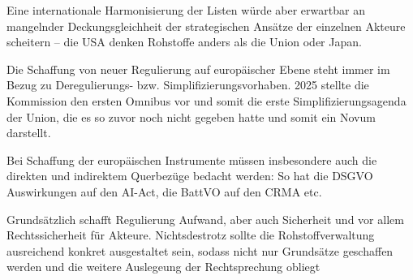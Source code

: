 \documentclass[12pt,a4paper,oneside]{book} %
\begin{document}
Eine internationale Harmonisierung der Listen würde aber erwartbar an mangelnder Deckungsgleichheit der strategischen Ansätze der einzelnen Akteure scheitern -- die USA denken Rohstoffe anders als die Union oder Japan.

Die Schaffung von neuer Regulierung auf europäischer Ebene steht immer im Bezug zu Deregulierungs- bzw. Simplifizierungsvorhaben. 2025 stellte die Kommission den ersten Omnibus vor und somit die erste Simplifizierungsagenda der Union, die es so zuvor noch nicht gegeben hatte und somit ein Novum darstellt.

Bei Schaffung der europäischen Instrumente müssen insbesondere auch die direkten und indirektem Querbezüge bedacht werden: So hat die DSGVO Auswirkungen auf den AI-Act, die BattVO auf den CRMA etc.

Grundsätzlich schafft Regulierung Aufwand, aber auch Sicherheit und vor allem Rechtssicherheit für Akteure. Nichtsdestrotz sollte die Rohstoffverwaltung ausreichend konkret ausgestaltet sein, sodass nicht nur Grundsätze geschaffen werden und die weitere Auslegeung der Rechtsprechung obliegt

	
\end{document}
